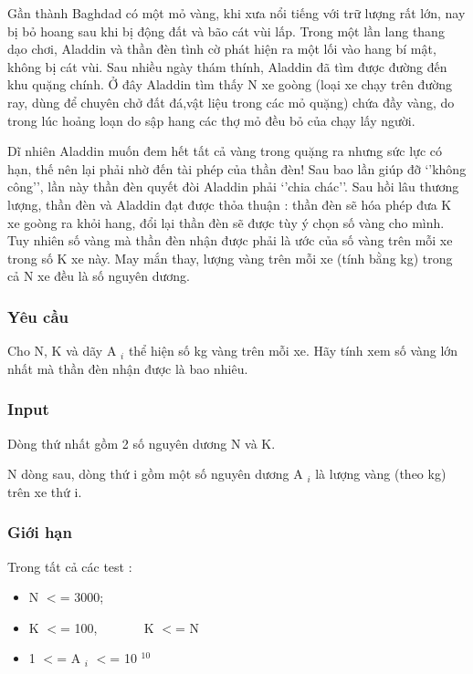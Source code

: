 

Gần thành Baghdad có một mỏ vàng, khi xưa nổi tiếng với trữ lượng rất lớn, nay bị bỏ hoang sau khi bị động đất và bão cát vùi lấp. Trong một lần lang thang dạo chơi, Aladdin và thần đèn tình cờ phát hiện ra một lối vào hang bí mật, không bị cát vùi. Sau nhiều ngày thám thính, Aladdin đã tìm được đường đến khu quặng chính. Ở đây Aladdin tìm thấy N xe goòng (loại xe chạy trên đường ray, dùng để chuyên chở đất đá,vật liệu trong các mỏ quặng) chứa đầy vàng, do trong lúc hoảng loạn do sập hang các thợ mỏ đều bỏ của chạy lấy người.

Dĩ nhiên Aladdin muốn đem hết tất cả vàng trong quặng ra nhưng sức lực có hạn, thế nên lại phải nhờ đến tài phép của thần đèn! Sau bao lần giúp đỡ ‘’không công’’, lần này thần đèn quyết đòi Aladdin phải ‘’chia chác’’. Sau hồi lâu thương lượng, thần đèn và Aladdin đạt được thỏa thuận : thần đèn sẽ hóa phép đưa K xe goòng ra khỏi hang, đổi lại thần đèn sẽ được tùy ý chọn số vàng cho mình. Tuy nhiên số vàng mà thần đèn nhận được phải là ước của số vàng trên mỗi xe trong số K xe này. May mắn thay, lượng vàng trên mỗi xe (tính bằng kg) trong cả N xe đều là số nguyên dương.

\subsubsection{Yêu cầu}

Cho N, K và dãy A $_ i $ thể hiện số kg vàng trên mỗi xe. Hãy tính xem số vàng lớn nhất mà thần đèn nhận được là bao nhiêu.

\subsubsection{Input}

Dòng thứ nhất gồm 2 số nguyên dương N và K.

N dòng sau, dòng thứ i gồm một số nguyên dương A $_ i $ là lượng vàng (theo kg) trên xe thứ i.

\subsubsection{Giới hạn}

Trong tất cả các test :
\begin{itemize}
	\item N $<$= 3000;
	\item K $<$= 100,        K $<$= N
	\item 1 $<$= A $_ i $ $<$= 10 $^ 10 $
\end{itemize}

